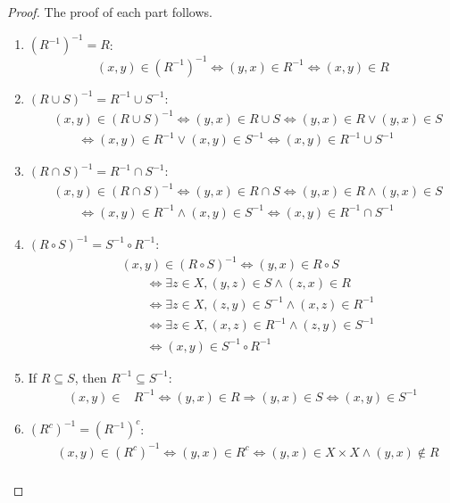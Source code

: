 \documentclass[
  letterpaper,
  10pt,
  reqno,
  twopage,
  openany]{book}
\theoremstyle{plain}
\theoremstyle{definition}
\theoremstyle{definition}
\theoremstyle{definition}
\theoremstyle{plain}
\theoremstyle{plain}
\theoremstyle{remark}
\begin{document}
\begin{proof}

The proof of each part follows.

\begin{enumerate}
\def\labelenumi{(\arabic{enumi})}
\item
  \((R^{-1})^{-1}=R\): \[
  (x,y)\in (R^{-1})^{-1} \Longleftrightarrow (y,x)\in R^{-1} \Longleftrightarrow (x,y)\in R
  \]
\item
  \((R\cup S)^{-1}=R^{-1}\cup S^{-1}\): \begin{align*}
  & (x,y)\in (R\cup S)^{-1}  \Longleftrightarrow (y,x)\in R\cup S \Longleftrightarrow (y,x)\in R \lor (y,x)\in S \\ 
  & \qquad \Longleftrightarrow (x,y)\in R^{-1} \lor (x,y)\in S^{-1} \Longleftrightarrow (x,y)\in R^{-1}\cup S^{-1}
  \end{align*}
\item
  \((R\cap S)^{-1}=R^{-1}\cap S^{-1}\): \begin{align*}
  & (x,y)\in (R\cap S)^{-1}  \Longleftrightarrow (y,x)\in R\cap S \Longleftrightarrow (y,x)\in R \land (y,x)\in S\\ 
  &  \qquad \Longleftrightarrow (x,y)\in R^{-1} \land (x,y)\in S^{-1} \Longleftrightarrow (x,y)\in R^{-1}\cap S^{-1}
  \end{align*}
\item
  \((R\circ S)^{-1}=S^{-1}\circ R^{-1}\): \begin{align*}
  & (x,y)\in (R\circ S)^{-1} \Longleftrightarrow (y,x)\in R\circ S\\ 
  & \qquad \Longleftrightarrow \exists z\in X, (y,z)\in S \land (z,x)\in R\\ 
  &  \qquad \Longleftrightarrow \exists z\in X, (z,y)\in S^{-1} \land (x,z)\in R^{-1}\\ 
  & \qquad \Longleftrightarrow \exists z\in X, (x,z)\in R^{-1} \land (z,y)\in S^{-1} \\ 
  &  \qquad \Longleftrightarrow (x,y)\in S^{-1} \circ R^{-1} 
  \end{align*}
\item
  If \(R\subseteq S\), then \(R^{-1}\subseteq S^{-1}\): \begin{align*}
  (x,y)\in & R^{-1} \Longleftrightarrow (y,x)\in R \Longrightarrow (y,x)\in S \Longleftrightarrow (x,y) \in S^{-1}
  \end{align*}
\item
  \((R^c)^{-1}=(R^{-1})^c\): \begin{align*}
  & (x,y)\in (R^c)^{-1} \Longleftrightarrow (y,x)\in R^c \Longleftrightarrow (y,x)\in X\times X \land (y,x)\notin R\\ 

\end{align*}
\end{enumerate}
\end{proof}
\end{document}
